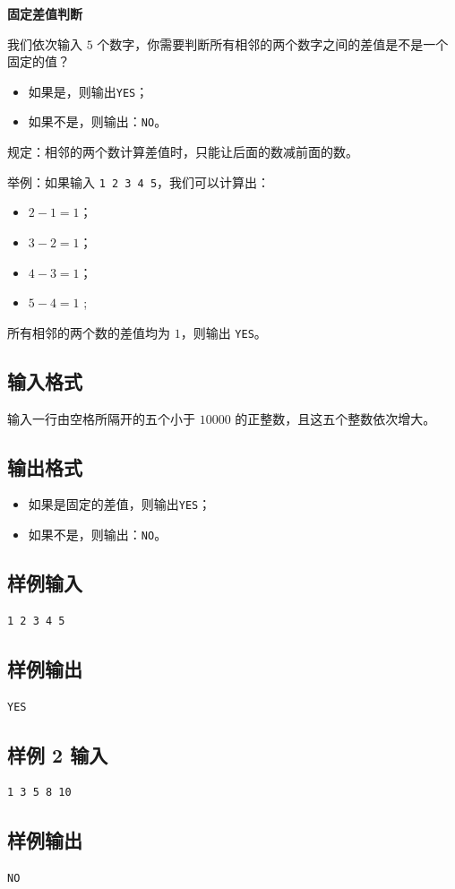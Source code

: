 \documentclass{article}
\newcommand{\problemname}[1]{\begin{center}\Large\bfseries #1\end{center}}
\begin{document}
\problemname{固定差值判断}

我们依次输入 $5$ 个数字，你需要判断所有相邻的两个数字之间的差值是不是一个固定的值？

\begin{itemize}
  \item 如果是，则输出\texttt{YES}；

  \item 如果不是，则输出：\texttt{NO}。

\end{itemize}
规定：相邻的两个数计算差值时，只能让后面的数减前面的数。

举例：如果输入 \texttt{1 2 3 4 5}，我们可以计算出：

\begin{itemize}
  \item $2-1=1$；

  \item $3-2=1$；

  \item $4-3=1$；

  \item $5-4=1$ ;

\end{itemize}
所有相邻的两个数的差值均为 $1$，则输出 \texttt{YES}。

\subsection*{输入格式}
输入一行由空格所隔开的五个小于 $10000$ 的正整数，且这五个整数依次增大。

\subsection*{输出格式}
\begin{itemize}
  \item 如果是固定的差值，则输出\texttt{YES}；

  \item 如果不是，则输出：\texttt{NO}。

\end{itemize}
\subsection*{样例输入}
\begin{verbatim}
1 2 3 4 5
\end{verbatim}

\subsection*{样例输出}
\begin{verbatim}
YES
\end{verbatim}

\subsection*{样例 2 输入}
\begin{verbatim}
1 3 5 8 10
\end{verbatim}

\subsection*{样例输出}
\begin{verbatim}
NO
\end{verbatim}
\end{document}
